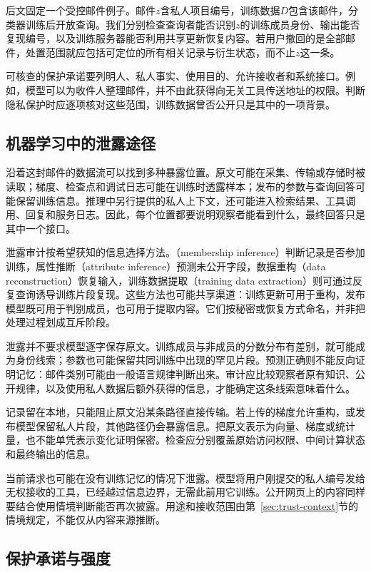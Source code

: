 后文固定一个受控邮件例子。邮件$z$含私人项目编号，训练数据$D$包含该邮件，分类器训练后开放查询。我们分别检查查询者能否识别$z$的训练成员身份、输出能否复现编号，以及训练服务器能否利用共享更新恢复内容。若用户撤回的是全部邮件，处置范围就应包括可定位的所有相关记录与衍生状态，而不止$z$这一条。

可核查的保护承诺要列明人、私人事实、使用目的、允许接收者和系统接口。例如，模型可以为收件人整理邮件，并不由此获得向无关工具传送地址的权限。判断隐私保护时应逐项核对这些范围，训练数据曾否公开只是其中的一项背景。

\subsection{机器学习中的泄露途径}
\label{sec:privacy-leakage-channels}

沿着这封邮件的数据流可以找到多种暴露位置。原文可能在采集、传输或存储时被读取；梯度、检查点和调试日志可能在训练时透露样本；发布的参数与查询回答可能保留训练信息。推理中另行提供的私人上下文，还可能进入检索结果、工具调用、回复和服务日志。因此，每个位置都要说明观察者能看到什么，最终回答只是其中一个接口。

泄露审计按希望获知的信息选择方法。（membership inference）判断记录是否参加训练，属性推断（attribute inference）预测未公开字段，数据重构（data reconstruction）恢复输入，训练数据提取（training data extraction）则可通过反复查询诱导训练片段复现。这些方法也可能共享渠道：训练更新可用于重构，发布模型既可用于判别成员，也可用于提取内容。它们按秘密或恢复方式命名，并非把处理过程划成互斥阶段。

泄露并不要求模型逐字保存原文。训练成员与非成员的分数分布有差别，就可能成为身份线索；参数也可能保留共同训练中出现的罕见片段。预测正确则不能反向证明记忆：邮件类别可能由一般语言规律判断出来。审计应比较观察者原有知识、公开规律，以及使用私人数据后额外获得的信息，才能确定这条线索意味着什么。

记录留在本地，只能阻止原文沿某条路径直接传输。若上传的梯度允许重构，或发布模型保留私人片段，其他路径仍会暴露信息。把原文表示为向量、梯度或统计量，也不能单凭表示变化证明保密。检查应分别覆盖原始访问权限、中间计算状态和最终输出的信息。

当前请求也可能在没有训练记忆的情况下泄露。模型将用户刚提交的私人编号发给无权接收的工具，已经越过信息边界，无需此前用它训练。公开网页上的内容同样要结合使用情境判断能否再次披露。用途和接收范围由第~\ref{sec:trust-context}节的情境规定，不能仅从内容来源推断。

\subsection{保护承诺与强度}
\label{sec:privacy-guarantees}


